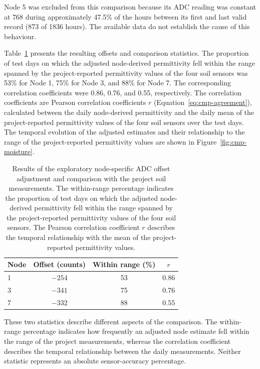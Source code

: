 Node 5 was excluded from this comparison because its ADC reading was constant at 768 during approximately 47.5\% of the hours between its first and last valid record (873 of 1836 hours). The available data do not establish the cause of this behaviour.

Table~\ref{tab:cmp-moisture} presents the resulting offsets and comparison statistics. The proportion of test days on which the adjusted node-derived permittivity fell within the range spanned by the project-reported permittivity values of the four soil sensors was 53\% for Node 1, 75\% for Node 3, and 88\% for Node 7. The corresponding correlation coefficients were 0.86, 0.76, and 0.55, respectively. The correlation coefficients are Pearson correlation coefficients $r$ (Equation~\ref{eq:cmp-agreement}), calculated between the daily node-derived permittivity and the daily mean of the project-reported permittivity values of the four soil sensors over the test days. The temporal evolution of the adjusted estimates and their relationship to the range of the project-reported permittivity values are shown in Figure~\ref{fig:cmp-moisture}.

\begin{table}[htbp]
\centering
\caption{Results of the exploratory node-specific ADC offset adjustment and comparison with the project soil measurements. The within-range percentage indicates the proportion of test days on which the adjusted node-derived permittivity fell within the range spanned by the project-reported permittivity values of the four soil sensors. The Pearson correlation coefficient $r$ describes the temporal relationship with the mean of the project-reported permittivity values.}
\label{tab:cmp-moisture}
\small
\setlength{\tabcolsep}{6pt}
\begin{tabular}{l c c c}
\hline
Node & Offset (counts) & Within range (\%) & $r$ \\
\hline
1 & $-254$ & 53 & 0.86 \\
3 & $-341$ & 75 & 0.76 \\
7 & $-332$ & 88 & 0.55 \\
\hline
\end{tabular}
\end{table}

These two statistics describe different aspects of the comparison. The within-range percentage indicates how frequently an adjusted node estimate fell within the range of the project measurements, whereas the correlation coefficient describes the temporal relationship between the daily measurements. Neither statistic represents an absolute sensor-accuracy percentage.

